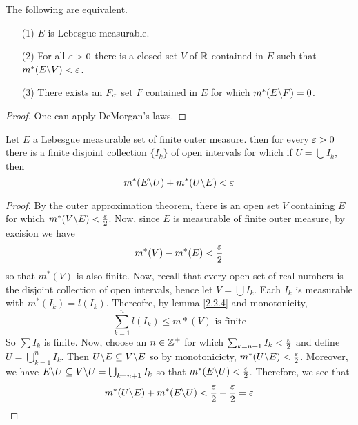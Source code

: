 \begin{corollary}
    The following are equivalent.
    \begin{enumerate}
        \item[(1)] $E$ is Lebesgue measurable.

        \item[(2)] For all $\varepsilon>0$ there is a closed set $V$ of $\mathbb{R}$ contained in
             $E$ such that $m^\ast(E\backslash V)<\varepsilon$.

         \item[(3)] There exists an $F_\sigma$ set $F$ contained in $E$ for which
             $m^\ast(E\backslash F)=0$.
    \end{enumerate}
\end{corollary}
\begin{proof}
    One can apply DeMorgan's laws.
\end{proof}

\begin{theorem}\label{2.3.3}
    Let $E$ a Lebesgue measurable set of finite outer measure. then for every
    $\varepsilon>0$ there is a finite disjoint collection  $\{I_k\}$ of open intervals
    for which if $U=\bigcup{I_k}$, then
    \begin{equation*}
        m^\ast(E\backslash U)+m^\ast(U\backslash E)<\varepsilon
    \end{equation*}
\end{theorem}
\begin{proof}
    By the outer approximation theorem, there is an open set $V$ containing  $E$
    for which  $m^\ast(V\backslash E)<\frac{\varepsilon}{2}$. Now, since $E$ is measurable
    of finite outer measure, by excision we have
    \begin{equation*}
        m^\ast(V)-m^\ast(E)<\frac{\varepsilon}{2}
    \end{equation*}
    so that $m^\ast(V)$ is also finite. Now, recall that every open set of real
    numbers is the disjoint collection of open intervals, hence let
    $V=\bigcup{I_k}$. Each $I_k$ is measurable with  $m^\ast(I_k)=l(I_k)$.
    Thereofre, by lemma \ref{2.2.4} and monotonicity,
    \begin{equation*}
        \sum_{k=1}^n{l(I_k)} \leq m*(V) \text{ is finite}
    \end{equation*}
    So $\sum{I_k}$ is finite. Now, choose an $n \in \mathbb{Z}^+$ for which
    $\sum_{k=n+1}{I_k}<\frac{\varepsilon}{2}$ and define $U=\bigcup_{k=1}^n{I_k}$. Then
    $U\backslash E \subseteq V\backslash E$ so by monotonicicty,
    $m^\ast(U\backslash E)<\frac{\varepsilon}{2}$. Moreover, we have $E\backslash U \subseteq
    V\backslash U=\bigcup_{k=n+1}{I_k}$ so that $m^\ast(E\backslash U)<\frac{\varepsilon}{2}$.
    Therefore, we see that
    \begin{equation*}
        m^\ast(U\backslash E)+m^\ast(E\backslash U)<\frac{\varepsilon}{2}+\frac{\varepsilon}{2}=\varepsilon
    \end{equation*}
\end{proof}
